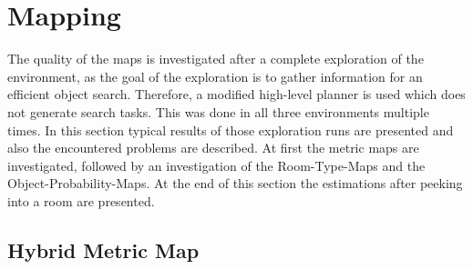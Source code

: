
\section{Mapping}

The quality of the maps is investigated after a complete exploration of the environment, as the goal of the exploration is to gather information for an efficient object search. Therefore, a modified high-level planner is used which does not generate search tasks. This was done in all three environments multiple times. In this section typical results of those exploration runs are presented and also the encountered problems are described. At first the metric maps are investigated, followed by an investigation of the Room-Type-Maps and the Object-Probability-Maps. At the end of this section the estimations after peeking into a room are presented.

\subsection{Hybrid Metric Map} \label{EvalMapping}

